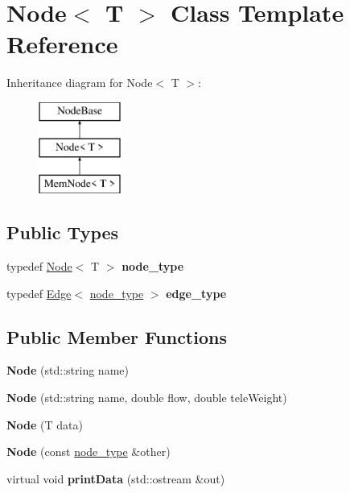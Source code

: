 \hypertarget{classNode}{}\section{Node$<$ T $>$ Class Template Reference}
\label{classNode}
Inheritance diagram for Node$<$ T $>$\+:\begin{figure}[H]
\begin{center}
\leavevmode
\includegraphics[height=3.000000cm]{classNode}
\end{center}
\end{figure}
\subsection*{Public Types}
\begin{DoxyCompactItemize}
\item 
\mbox{\label{classNode_aa7e6b5582624ef1e8eedac07e620a208}} 
typedef \mbox{\hyperlink{classNode}{Node}}$<$ T $>$ {\bfseries node\+\_\+type}
\item 
\mbox{\label{classNode_afbe280f14fe9ca1e184d975fa24415b0}} 
typedef \mbox{\hyperlink{classEdge}{Edge}}$<$ \mbox{\hyperlink{classNode}{node\+\_\+type}} $>$ {\bfseries edge\+\_\+type}
\end{DoxyCompactItemize}
\subsection*{Public Member Functions}
\begin{DoxyCompactItemize}
\item 
\mbox{\label{classNode_ad417826027504b85ef6b50735ca64bee}} 
{\bfseries Node} (std\+::string name)
\item 
\mbox{\label{classNode_aaeebae509d7dbfb05328124ffbd3f7f2}} 
{\bfseries Node} (std\+::string name, double flow, double tele\+Weight)
\item 
\mbox{\label{classNode_a0692b16d246460bf94c18d49592facdd}} 
{\bfseries Node} (T data)
\item 
\mbox{\label{classNode_acf3c93a34ec38f260a20186e4c126a2d}} 
{\bfseries Node} (const \mbox{\hyperlink{classNode}{node\+\_\+type}} \&other)
\item 
\mbox{\label{classNode_adf5e7c58a8b667bde50a9d54de5cd5c1}} 
virtual void {\bfseries print\+Data} (std\+::ostream \&out)
\end{DoxyCompactItemize}

